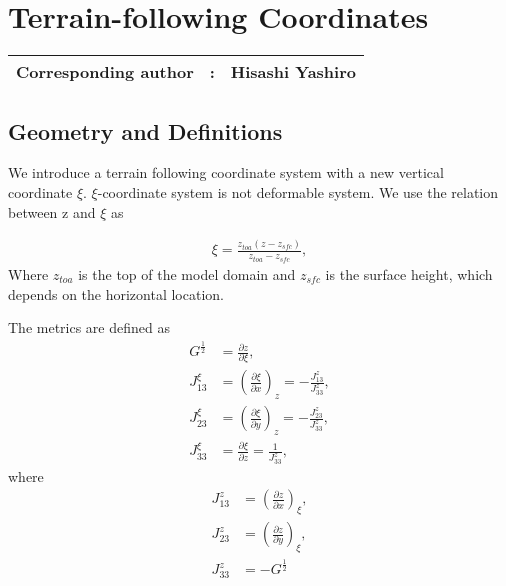 \chapter{Terrain-following Coordinates}
\label{chap:terrain-following}
{\bf \Large 
\begin{tabular}{ccc}
\hline
  Corresponding author & : & Hisashi Yashiro\\
\hline
\end{tabular}
}

\section{Geometry and Definitions}
We introduce a terrain following coordinate system with a new vertical coordinate $\xi$. 
$\xi$-coordinate system is not deformable system. We use the relation between z and $\xi$ as

\begin{eqnarray}
 \xi = \frac{z_{toa}(z-z_{sfc})}{z_{toa}-z_{sfc}},
\end{eqnarray}
Where $z_{toa}$ is the top of the model domain and $z_{sfc}$ is the surface height, 
which depends on the horizontal location.

The metrics are defined as
\begin{align}
 G^{\frac{1}{2}} &= \frac{\partial z}{\partial \xi}, \\
 J^{\xi}_{13} &= \left(\frac{\partial \xi}{\partial x}\right)_{z} = -\frac{J^{z}_{13}}{J^{z}_{33}},\\
 J^{\xi}_{23} &= \left(\frac{\partial \xi}{\partial y}\right)_{z} = -\frac{J^{z}_{23}}{J^{z}_{33}},\\
 J^{\xi}_{33} &=       \frac{\partial \xi}{\partial z}            =  \frac{1}         {J^{z}_{33}},
\end{align}
where
\begin{align}
 J^{z}_{13} &= \left(\frac{\partial z}{\partial x}\right)_{\xi},\\
 J^{z}_{23} &= \left(\frac{\partial z}{\partial y}\right)_{\xi},\\
 J^{z}_{33} &= -{G^{\frac{1}{2}}}
\end{align}


